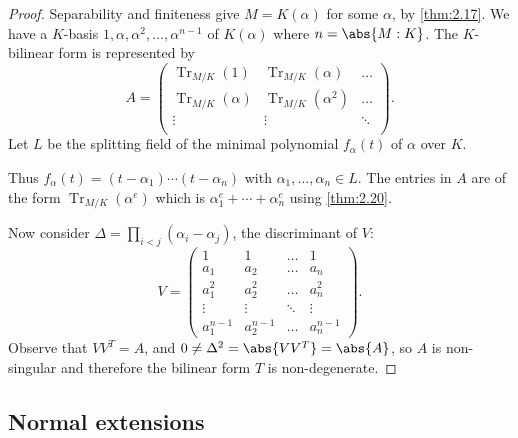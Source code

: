 \documentclass{article}
\DeclareMathOperator{\Tr}{Tr}
\begin{document}
\begin{proof}
    Separability and finiteness give $M=K(\alpha)$ for some $\alpha$, by \cref{thm:2.17}.
    We have a $K$-basis $1, \alpha, \alpha^2, \dotsc, \alpha^{n-1}$ of $K(\alpha)$ where $n = \abs{M:K}$.
    The $K$-bilinear form is represented by
    \begin{equation*}
        A =
        \begin{pmatrix}
            \Tr_{M/K}(1)      & \Tr_{M/K}(\alpha)   & \dots  \\
            \Tr_{M/K}(\alpha) & \Tr_{M/K}(\alpha^2) & \dots  \\
            \vdots            & \vdots              & \ddots \\
        \end{pmatrix}.
    \end{equation*}
    Let $L$ be the splitting field of the minimal polynomial $f_\alpha(t)$ of $\alpha$ over $K$.

    Thus $f_\alpha(t) = (t-\alpha_1) \dotsm (t-\alpha_n)$ with $\alpha_1, \dotsc, \alpha_n \in L$.
    The entries in $A$ are of the form $\Tr_{M/K}(\alpha^e)$ which is $\alpha_1^e + \dotsb + \alpha_n^e$ using \cref{thm:2.20}.

    Now consider $\Delta = \prod_{i < j} (\alpha_i - \alpha_j)$, the discriminant of $V$:
    \begin{equation*}
        V =
        \begin{pmatrix}
            1 & 1 & \dots & 1 \\
            a_1 & a_2 & \dots & a_n \\
            a_1^2 & a_2^2 & \dots & a_n^2 \\
            \vdots & \vdots & \ddots & \vdots \\
            a_1^{n-1} & a_2^{n-1} & \dots & a_n^{n-1}
        \end{pmatrix}.
    \end{equation*}
    Observe that $V V^T = A$, and $0 \neq \Delta^2 = \abs{V V^T} = \abs{A}$, so $A$ is non-singular and therefore the bilinear form $T$ is non-degenerate.
\end{proof}

\subsection{Normal extensions}
\end{document}
